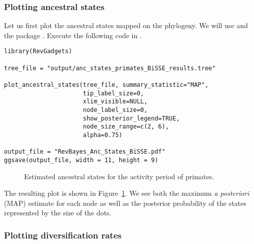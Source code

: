\subsubsection{Plotting ancestral states}

Let us first plot the ancestral states mapped on the phylogeny.
We will use \R and the package \RevGadgets.
Execute the following code in \R.
{\tt \begin{snugshade*}
\begin{lstlisting}
library(RevGadgets)

tree_file = "output/anc_states_primates_BiSSE_results.tree"

plot_ancestral_states(tree_file, summary_statistic="MAP",
                      tip_label_size=0,
                      xlim_visible=NULL,
                      node_label_size=0,
                      show_posterior_legend=TRUE,
                      node_size_range=c(2, 6),
                      alpha=0.75)

output_file = "RevBayes_Anc_States_BiSSE.pdf"
ggsave(output_file, width = 11, height = 9)
\end{lstlisting}
\end{snugshade*}}
\begin{figure}[h!]
\centering
{}
\caption{\small Estimated ancestral states for the activity period of primates.}
\label{fig:anc_states_BiSSE}
\end{figure}
The resulting plot is shown in Figure~\ref{fig:anc_states_BiSSE}.
We see both the maximum \emph{a posteriori} (MAP) estimate for each node as well as the posterior probability of the states represented by the size of the dots.

\subsubsection{Plotting diversification rates}

